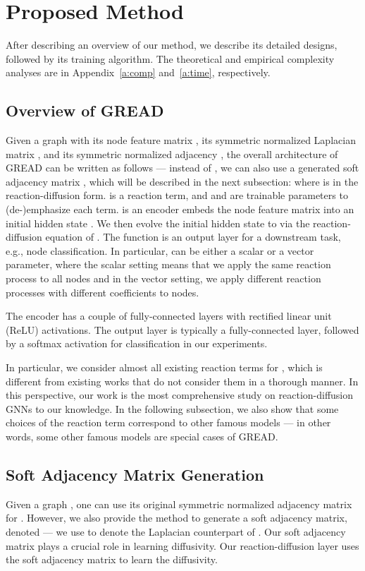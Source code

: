 \documentclass{article}
\theoremstyle{plain}
\theoremstyle{definition}
\theoremstyle{remark}
\begin{document}
\section{Proposed Method}
After describing an overview of our method, we describe its detailed designs, followed by its training algorithm. The theoretical and empirical complexity analyses are in Appendix~\ref{a:comp} and~\ref{a:time}, respectively.

\subsection{Overview of GREAD}
Given a graph  with its node feature matrix , its symmetric normalized Laplacian matrix , and its symmetric normalized adjacency , the overall architecture of GREAD can be written as follows --- instead of , we can also use a generated soft adjacency matrix , which will be described in the next subsection:
\begingroup\makeatletter\def\f@size{9}\check@mathfonts
\def\maketag@@@#1{\hbox{\m@th\small\normalfont#1}}\endgroup where  is in the reaction-diffusion form.  is a reaction term, and  and  are trainable parameters to (de-)emphasize each term.  is an encoder embeds the node feature matrix  into an initial hidden state . We then evolve the initial hidden state to  via the reaction-diffusion equation of . The function  is an output layer for a downstream task, e.g., node classification. In particular,  can be either a scalar or a vector parameter, where the scalar setting means that we apply the same reaction process to all nodes and in the vector setting, we apply different reaction processes with different coefficients to nodes.

The encoder  has a couple of fully-connected layers with rectified linear unit (ReLU) activations. The output layer  is typically a fully-connected layer, followed by a softmax activation for classification in our experiments.

In particular, we consider almost all existing reaction terms for , which is different from existing works that do not consider them in a thorough manner. In this perspective, our work is the most comprehensive study on reaction-diffusion GNNs to our knowledge. In the following subsection, we also show that some choices of the reaction term correspond to other famous models --- in other words, some other famous models are special cases of GREAD.

\subsection{Soft Adjacency Matrix Generation}
Given a graph , one can use its original symmetric normalized adjacency matrix  for . However, we also provide the method to generate a soft adjacency matrix, denoted  --- we use  to denote the Laplacian counterpart of . Our soft adjacency matrix plays a crucial role in learning diffusivity. Our reaction-diffusion layer uses the soft adjacency matrix to learn the diffusivity.
\end{document}
